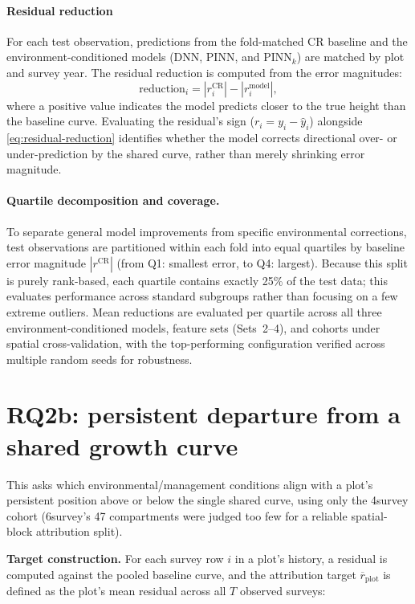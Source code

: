 \documentclass[11pt,a4paper]{report}
\begin{document}
\paragraph*{Residual reduction}
For each test observation, predictions from the fold-matched CR baseline and the environment-conditioned models (DNN, PINN, and PINN$_k$) are matched by plot and survey year. The residual reduction is computed from the error magnitudes:
\begin{equation}
\text{reduction}_i = \left|r_i^{\text{CR}}\right| - \left|r_i^{\text{model}}\right|,
\label{eq:residual-reduction}
\end{equation}
where a positive value indicates the model predicts closer to the true height than the baseline curve. Evaluating the residual's sign ($r_i = y_i - \hat{y}_i$) alongside \eqref{eq:residual-reduction} identifies whether the model corrects directional over- or under-prediction by the shared curve, rather than merely shrinking error magnitude.

\paragraph*{Quartile decomposition and coverage.} To separate general model improvements from specific environmental corrections, test observations are partitioned within each fold into equal quartiles by baseline error magnitude $|r^{\text{CR}}|$ (from Q1: smallest error, to Q4: largest). Because this split is purely rank-based, each quartile contains exactly 25\% of the test data; this evaluates performance across standard subgroups rather than focusing on a few extreme outliers. Mean reductions are evaluated per quartile across all three environment-conditioned models, feature sets (Sets~2--4), and cohorts under spatial cross-validation, with the top-performing configuration verified across multiple random seeds for robustness.

\section{RQ2b: persistent departure from a shared growth curve}
\label{sec:rq2b}
This asks which environmental/management conditions align with a plot's persistent position above or below the single shared curve, using only the 4survey cohort (6survey's 47 compartments were judged too few for a reliable spatial-block attribution split).

\textbf{Target construction.}
For each survey row $i$ in a plot's history, a residual is computed against the pooled baseline curve, and the attribution target $\overline{r}_{\text{plot}}$ is defined as the plot's mean residual across all $T$ observed surveys:
\end{document}
